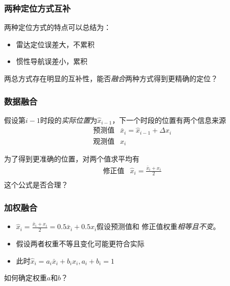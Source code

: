\documentclass[14pt]{beamer}
\begin{document}
\begin{frame}
  \frametitle{两种定位方式互补}
  两种定位方式的特点可以总结为：
  \begin{itemize}
    \item 雷达定位误差大，不累积
    \item 惯性导航误差小，累积
  \end{itemize}
  两总方式存在明显的互补性，能否\emph{融合}两种方式得到更精确的定位？
\end{frame}

\begin{frame}
  \frametitle{数据融合}
  假设第$i-1$时段的\emph{实际位置}为$\hat{x}_{i-1}$，下一个时段的位置有两个信息来源
  \begin{equation*}
    \begin{array}{ll}
      \text{预测值} & \bar{x}_i=\hat{x}_{i-1}+\Delta x_i\\
      \text{观测值} & x_i
    \end{array}
  \end{equation*}

  为了得到更准确的位置，对两个值求平均有
  \begin{equation*}
    \begin{array}{ll}
        \text{修正值}&\hat{x}_i=\frac{\bar{x}_i+x_i}{2}\\
    \end{array}
  \end{equation*}
  这个公式是否合理？
\end{frame}

\begin{frame}
  \frametitle{加权融合}
    \begin{itemize}
      \item $\hat{x}_i=\frac{\bar{x}_i+x_i}{2}=0.5\bar{x}_i+0.5x_i$假设预测值和
    修正值权重\emph{相等且不变}。
      \item 假设两者权重不等且变化可能更符合实际
      \item 此时$\hat{x}_i=a_i \bar{x}_i+b_i x_i,a_i+b_i=1$
    \end{itemize}
  
    如何确定权重$a$和$b$？
\end{frame}
\end{document}
